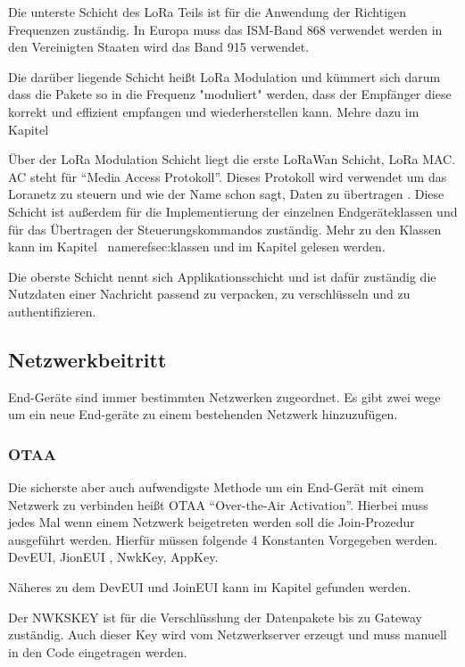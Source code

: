 \documentclass[a4paper,12pt]{article}
\begin{document}
            Die unterste Schicht des LoRa Teils ist für die Anwendung der Richtigen Frequenzen zuständig. In Europa 
            muss das ISM-Band 868 verwendet werden in den Vereinigten Staaten wird das Band 915 
            verwendet.\cite[S.7]{WhatIsLoRa}

            Die darüber liegende Schicht heißt LoRa Modulation und kümmert sich darum dass die Pakete so in die 
            Frequenz "moduliert" werden, dass der Empfänger diese korrekt und effizient empfangen und wiederherstellen 
            kann. Mehre dazu im Kapitel 

            Über der LoRa Modulation Schicht liegt die erste LoRaWan Schicht, LoRa MAC. AC steht für ``Media Access 
            Protokoll''. Dieses Protokoll wird verwendet um das Loranetz zu steuern und wie der Name schon sagt, 
            Daten zu übertragen . Diese Schicht ist außerdem für die Implementierung der einzelnen Endgeräteklassen 
            und für das Übertragen der Steuerungskommandos zuständig. Mehr zu den Klassen kann im Kapitel \
            nameref{sec:klassen} und im Kapitel  gelesen werden.

            Die oberste Schicht nennt sich Applikationsschicht und ist dafür zuständig die Nutzdaten einer Nachricht 
            passend zu verpacken, zu verschlüsseln und zu authentifizieren.
        \subsection{Netzwerkbeitritt}
            End-Geräte sind immer bestimmten Netzwerken zugeordnet. Es gibt zwei wege um ein neue End-geräte zu einem 
            bestehenden Netzwerk hinzuzufügen.
            \subsubsection{OTAA} \label{sec:OTAA}
                Die sicherste aber auch aufwendigste Methode um ein End-Gerät mit einem Netzwerk zu verbinden heißt 
                OTAA ``Over-the-Air Activation''. Hierbei muss jedes Mal wenn einem Netzwerk beigetreten werden soll 
                die Join-Prozedur ausgeführt werden. Hierfür müssen folgende 4 Konstanten Vorgegeben werden. DevEUI, 
                JionEUI , NwkKey, AppKey.

                Näheres zu dem DevEUI und JoinEUI kann im Kapitel  gefunden werden.

                Der NWKSKEY ist für die Verschlüsslung der Datenpakete bis zu Gateway zuständig. Auch dieser Key wird 
                vom Netzwerkserver erzeugt und muss manuell in den Code eingetragen werden.\cite[S.3]{LoRaSecur}
            
\end{document}
